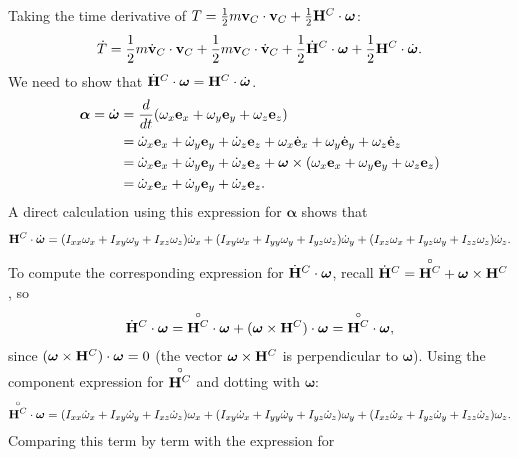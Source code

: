 \documentclass[
  letterpaper,
  DIV=11,
  numbers=noendperiod]{scrreprt}
\newcommand{\bomega}{\boldsymbol{\omega}}
\newcommand{\balpha}{\boldsymbol{\alpha}}
\begin{document}
Taking the time derivative of
\(T = \frac{1}{2}m{\bf v}_C\cdot{\bf v}_C+\frac{1}{2}{\bf H}^C\cdot\bomega\):
\begin{align}
    \dot{T} = \frac{1}{2}m\dot{\bf v}_C\cdot{\bf v}_C+\frac{1}{2}m{\bf v}_C\cdot\dot{\bf v}_C+\frac{1}{2}\dot{\bf H}^C\cdot\bomega+\frac{1}{2}{\bf H}^C\cdot\dot{\bomega}.
\end{align} We need to show that
\(\dot{\bf H}^C\cdot\bomega = {\bf H}^C\cdot\dot{\bomega}\).
\begin{align}
    \begin{split}
        \balpha = \dot{\bomega} &= \frac{d}{dt}(\omega_x{\bf e}_x+\omega_y{\bf e}_y+\omega_z{\bf e}_z)\\
        &= \dot{\omega}_x{\bf e}_x+\dot{\omega}_y{\bf e}_y+\dot{\omega}_z{\bf e}_z+\omega_x\dot{\bf e}_x+\omega_y\dot{\bf e}_y+\omega_z\dot{\bf e}_z\\
        &= \dot{\omega}_x{\bf e}_x+\dot{\omega}_y{\bf e}_y+\dot{\omega}_z{\bf e}_z+\bomega\times(\omega_x{\bf e}_x+\omega_y{\bf e}_y+\omega_z{\bf e}_z)\\
        &= \dot{\omega}_x{\bf e}_x+\dot{\omega}_y{\bf e}_y+\dot{\omega}_z{\bf e}_z.
    \end{split}
\end{align} A direct calculation using this expression for \(\balpha\)
shows that \begin{align}
    {\bf H}^C\cdot\dot{\bomega} = (I_{xx}\omega_x+I_{xy}\omega_y+I_{xz}\omega_z)\dot{\omega}_x+(I_{xy}\omega_x+I_{yy}\omega_y+I_{yz}\omega_z)\dot{\omega}_y+(I_{xz}\omega_x+I_{yz}\omega_y+I_{zz}\omega_z)\dot{\omega}_z.
\end{align} To compute the corresponding expression for
\(\dot{\bf H}^C\cdot\bomega\), recall
\(\dot{\bf H}^C=\overset{\circ}{{\bf H}^C}+\bomega\times{\bf H}^C\), so
\begin{align}
    \dot{\bf H}^C\cdot\bomega = \overset{\circ}{{\bf H}^C}\cdot\bomega+(\bomega\times{\bf H}^C)\cdot\bomega = \overset{\circ}{{\bf H}^C}\cdot\bomega,
\end{align} since \((\bomega\times{\bf H}^C)\cdot\bomega=0\) (the vector
\(\bomega\times{\bf H}^C\) is perpendicular to \(\bomega\)). Using the
component expression for \(\overset{\circ}{{\bf H}^C}\) and dotting with
\(\bomega\): \begin{align}
    \overset{\circ}{{\bf H}^C}\cdot\bomega = (I_{xx}\dot{\omega}_x+I_{xy}\dot{\omega}_y+I_{xz}\dot{\omega}_z)\omega_x+(I_{xy}\dot{\omega}_x+I_{yy}\dot{\omega}_y+I_{yz}\dot{\omega}_z)\omega_y+(I_{xz}\dot{\omega}_x+I_{yz}\dot{\omega}_y+I_{zz}\dot{\omega}_z)\omega_z.
\end{align} Comparing this term by term with the expression for
\end{document}
